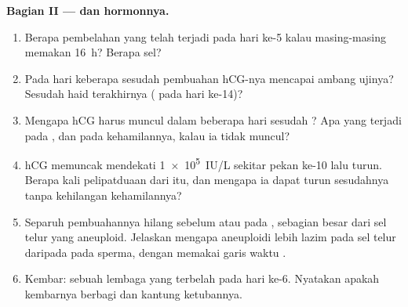 \begin{problem}
\medskip
\noindent\textbf{Bagian II ---  dan hormonnya.}
\begin{enumerate}[resume]
  \item Berapa pembelahan yang telah terjadi pada hari ke-5 kalau
        masing-masing memakan \qty{16}{h}? Berapa sel?
  \item Pada hari keberapa sesudah pembuahan hCG-nya mencapai ambang
        ujinya? Sesudah haid terakhirnya ( pada hari ke-14)?
  \item Mengapa hCG harus muncul dalam beberapa hari sesudah
        ? Apa yang terjadi pada , dan pada
        kehamilannya, kalau ia tidak muncul?
  \item hCG memuncak mendekati \qty{1e5}{IU/L} sekitar pekan ke-10 lalu
        turun. Berapa kali pelipatduaan dari  itu, dan
        mengapa ia dapat turun sesudahnya tanpa kehilangan kehamilannya?
  \item Separuh pembuahannya hilang sebelum atau pada ,
        sebagian besar dari sel telur yang aneuploid. Jelaskan mengapa
        aneuploidi lebih lazim pada sel telur daripada pada sperma,
        dengan memakai garis waktu .
  \item Kembar: sebuah lembaga yang terbelah pada hari ke-6. Nyatakan
        apakah kembarnya berbagi  dan kantung ketubannya.
\end{enumerate}


\end{problem}
